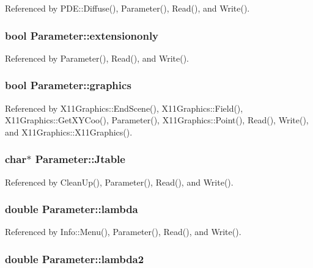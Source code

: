 Referenced by P\-D\-E\-::\-Diffuse(), Parameter(), Read(), and Write().

\subsubsection[{extensiononly}]{\setlength{\rightskip}{0pt plus 5cm}bool Parameter\-::extensiononly}\label{classParameter_a4adbb3447b62ed10e79417fc05e6e001}


Referenced by Parameter(), Read(), and Write().

\subsubsection[{graphics}]{\setlength{\rightskip}{0pt plus 5cm}bool Parameter\-::graphics}\label{classParameter_acea32477ca47dac4bf4d9c2ccab7658a}


Referenced by X11\-Graphics\-::\-End\-Scene(), X11\-Graphics\-::\-Field(), X11\-Graphics\-::\-Get\-X\-Y\-Coo(), Parameter(), X11\-Graphics\-::\-Point(), Read(), Write(), and X11\-Graphics\-::\-X11\-Graphics().

\subsubsection[{Jtable}]{\setlength{\rightskip}{0pt plus 5cm}char$\ast$ Parameter\-::\-Jtable}\label{classParameter_ad84d139492ebfd01f300386758931eae}


Referenced by Clean\-Up(), Parameter(), Read(), and Write().

\subsubsection[{lambda}]{\setlength{\rightskip}{0pt plus 5cm}double Parameter\-::lambda}\label{classParameter_abe9f230c003765ad37939333cfa611e7}


Referenced by Info\-::\-Menu(), Parameter(), Read(), and Write().

\subsubsection[{lambda2}]{\setlength{\rightskip}{0pt plus 5cm}double Parameter\-::lambda2}\label{classParameter_a696a2e8c2d3cd0fde64fc5bef92d923c}


